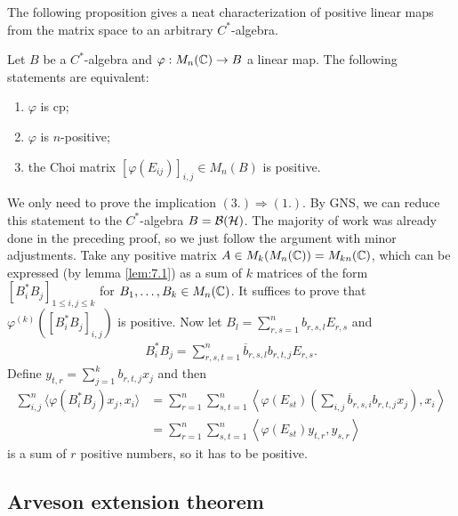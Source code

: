 The following proposition gives a neat characterization of positive linear maps from the matrix space to an arbitrary $C^*$-algebra.

\begin{proposition}
    Let $B$ be a $C^*$-algebra and $\varphi: M_n (\mathbb {C}) \to B$ a linear map. The following statements are equivalent:
    \begin{enumerate}
        \item $\varphi$ is cp;
        \item $\varphi$ is $n$-positive;
        \item the Choi matrix $[\varphi (E_{ij})]_{i, j} \in M_n (B)$ is positive.
    \end{enumerate}
\end{proposition}

\begin{myproof}
    We only need to prove the implication $(3.) \Rightarrow (1.)$.
    By GNS, we can reduce this statement to the $C^*$-algebra $B = \operatorname{\mathcal{B} (\mathcal{H})}$.
    The majority of work was already done in the preceding proof, so we just follow the argument with minor adjustments.
    Take any positive matrix $A \in M_k (M_n (\mathbb {C})) =M_{kn} (\mathbb {C})$,
    which can be expressed (by lemma \ref{lem:7.1}) as a sum of $k$ matrices of the form 
    $[B_i ^* B_j]_{1 \leq i, j  \leq k}$ for $B_1, \dots, B_k \in M_n (\mathbb {C})$.
    It suffices to prove that $\varphi^{(k)} ([B_i ^* B_j]_{i, j})$ is positive.
    Now let $B_l = \sum_{r, s = 1} ^n b_{r, s, l} E_{r, s}$ and
    \begin{align*}
        B_i ^* B_j = \sum_{r, s, t = 1} ^n \overline{b}_{r, s, l} b_{r, t, j} E_{r, s}.
    \end{align*}
    Define $y_{t, r} = \sum_{j = 1} ^k b_{r, t, j} x_j$ and then
    \begin{align*}
        \sum_{i, j} ^n \langle \varphi (B_i ^* B_j) x_j, x_i \rangle &= \sum_{r = 1} ^n \sum_{s, t = 1} ^n \left\langle \varphi (E_{st}) \left(\sum_{i, j} \overline{b}_{r, s, i} b_{r, t, j} x_j\right), x_i \right\rangle\\
        &= \sum_{r = 1} ^n \sum_{s, t = 1} ^n \left\langle \varphi (E_{st}) y_{t, r}, y_{s, r} \right\rangle
    \end{align*}
    is a sum of $r$ positive numbers, so it has to be positive.
\end{myproof}

\subsection{Arveson extension theorem}

